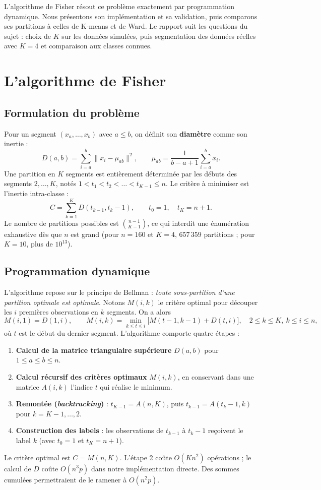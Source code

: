 \documentclass[10pt,a4paper]{article}
\begin{document}
L'algorithme de Fisher\cite{fisher} résout ce problème exactement par
programmation dynamique. Nous présentons son implémentation et sa validation,
puis comparons ses partitions à celles de K-means et de Ward. Le rapport suit les
questions du sujet : choix de $K$ sur les données simulées, puis segmentation
des données réelles avec $K=4$ et comparaison aux classes connues.

\section{L'algorithme de Fisher}

\subsection{Formulation du problème}

Pour un segment $(x_a,\dots,x_b)$ avec $a\le b$, on définit son
\textbf{diamètre} comme son inertie :
\[
D(a,b) = \sum_{i=a}^{b} \lVert x_i - \mu_{ab} \rVert^2,
\qquad \mu_{ab} = \frac{1}{b-a+1}\sum_{i=a}^{b} x_i .
\]
Une partition en $K$ segments est entièrement déterminée par les débuts des
segments $2,\dots,K$, notés $1 < t_1 < t_2 < \dots < t_{K-1} \le n$. Le critère
à minimiser est l'inertie intra-classe :
\[
C = \sum_{k=1}^{K} D(t_{k-1}, t_k-1), \qquad t_0=1,\quad t_K=n+1.
\]
Le nombre de partitions possibles est $\binom{n-1}{K-1}$, ce qui interdit une
énumération exhaustive dès que $n$ est grand (pour $n=160$ et $K=4$, $657\,359$
partitions ; pour $K=10$, plus de $10^{13}$).

\subsection{Programmation dynamique}

L'algorithme repose sur le principe de Bellman : \emph{toute sous-partition
d'une partition optimale est optimale}. Notons $M(i,k)$ le critère optimal pour
découper les $i$ premières observations en $k$ segments. On a alors
\[
M(i,1) = D(1,i), \qquad
M(i,k) = \min_{k \le t \le i} \bigl[ M(t-1, k-1) + D(t, i) \bigr], \quad 2\le k \le K,\ k\le i \le n,
\]
où $t$ est le début du dernier segment. L'algorithme comporte quatre étapes :
\begin{enumerate}
  \item \textbf{Calcul de la matrice triangulaire supérieure} $D(a,b)$ pour $1\le a\le b\le n$.
  \item \textbf{Calcul récursif des critères optimaux} $M(i,k)$, en conservant
        dans une matrice $A(i,k)$ l'indice $t$ qui réalise le minimum.
  \item \textbf{Remontée (\emph{backtracking})} : $t_{K-1} = A(n,K)$, puis
        $t_{k-1} = A(t_k - 1, k)$ pour $k = K-1,\dots,2$.
  \item \textbf{Construction des labels} : les observations de $t_{k-1}$ à $t_k - 1$
        reçoivent le label $k$ (avec $t_0=1$ et $t_K = n+1$).
\end{enumerate}
Le critère optimal est $C = M(n,K)$. L'étape 2 coûte $O(Kn^2)$ opérations ;
le calcul de $D$ coûte $O(n^3p)$ dans notre implémentation directe. Des sommes
cumulées permettraient de le ramener à $O(n^2p)$.
\end{document}
